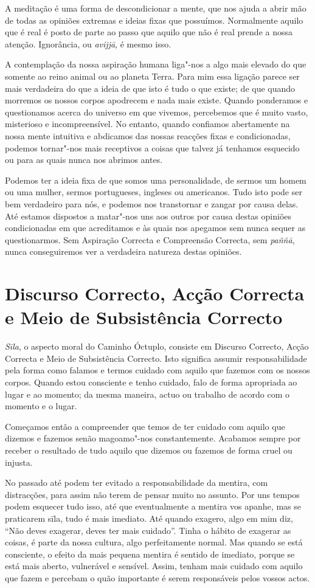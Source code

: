 A meditação é uma forma de descondicionar a mente, que nos ajuda a abrir mão de
todas as opiniões extremas e ideias fixas que possuímos. Normalmente aquilo que
é real é posto de parte ao passo que aquilo que não é real prende a nossa
atenção. Ignorância, ou \emph{avijjā}, é mesmo isso.

A contemplação da nossa aspiração humana liga"-nos a algo mais elevado do que
somente ao reino animal ou ao planeta Terra. Para mim essa ligação parece ser
mais verdadeira do que a ideia de que isto é tudo o que existe; de que quando
morremos os nossos corpos apodrecem e nada mais existe. Quando ponderamos e
questionamos acerca do universo em que vivemos, percebemos que é muito vasto,
misterioso e incompreensível. No entanto, quando confiamos abertamente na nossa
mente intuitiva e abdicamos das nossas reacções fixas e condicionadas, podemos
tornar"-nos mais receptivos a coisas que talvez já tenhamos esquecido ou para as
quais nunca nos abrimos antes.

Podemos ter a ideia fixa de que somos uma personalidade, de sermos um homem ou
uma mulher, sermos portugueses, ingleses ou americanos. Tudo isto pode ser bem
verdadeiro para nós, e podemos nos transtornar e zangar por causa delas. Até
estamos dispostos a matar"-nos uns aos outros por causa destas opiniões
condicionadas em que acreditamos e às quais nos apegamos sem nunca sequer as
questionarmos. Sem Aspiração Correcta e Compreensão Correcta, sem \emph{paññā},
nunca conseguiremos ver a verdadeira natureza destas opiniões.

\section{Discurso Correcto, Acção Correcta e Meio de Subsistência Correcto}

\emph{Sīla}, o aspecto moral do Caminho Óctuplo, consiste em Discurso Correcto,
Acção Correcta e Meio de Subsistência Correcto.  Isto significa assumir responsabilidade
pela forma como falamos e termos cuidado com aquilo que fazemos com os nossos
corpos. Quando estou consciente e tenho cuidado, falo de forma apropriada ao lugar e ao
momento; da mesma maneira, actuo ou trabalho de acordo com o momento e o lugar.

Começamos então a compreender que temos de ter cuidado com aquilo que dizemos e
fazemos senão magoamo"-nos constantemente. Acabamos sempre por receber o
resultado de tudo aquilo que dizemos ou fazemos de forma cruel ou injusta.

No passado até podem ter evitado a responsabilidade da mentira, com distracções,
para assim não terem de pensar muito no assunto. Por uns tempos podem esquecer
tudo isso, até que eventualmente a mentira vos apanhe, mas se praticarem sīla,
tudo é mais imediato. Até quando exagero, algo em mim diz, “Não deves exagerar,
deves ter mais cuidado”. Tinha o hábito de exagerar as coisas, é parte da
nossa cultura, algo perfeitamente normal. Mas quando se está consciente, o
efeito da mais pequena mentira é sentido de imediato, porque se está mais
aberto, vulnerável e sensível. Assim, tenham mais cuidado com aquilo que fazem e 
percebam o quão importante é serem responsáveis pelos vossos actos.

